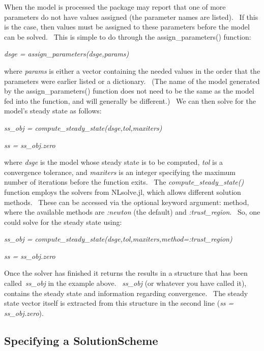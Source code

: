 \documentclass[notitlepage,11pt]{article}
\begin{document}
\bigskip

When the model is processed the package may report that one of more
parameters do not have values assigned (the parameter names are listed). \
If this is the case, then values must be assigned to these parameters before
the model can be solved. \ This is simple to do through the
assign\_parameters() function:

\bigskip

\textit{dsge = assign\_parameters(dsge,params)}

\bigskip

where \textit{params} is either a vector containing the needed values in the
order that the parameters were earlier listed or a dictionary. \ (The name
of the model generated by the assign\_parameters() function does not need to
be the same as the model fed into the function, and will generally be
different.) \ We can then solve for the model's steady state as follows:

\bigskip

\textit{ss\_obj = compute\_steady\_state(dsge,tol,maxiters)}

\textit{ss = ss\_obj.zero}

\bigskip

where \textit{dsge} is the model whose steady state is to be computed, 
\textit{tol} is a convergence tolerance, and \textit{maxiters} is an integer
specifying the maximum number of iterations before the function exits. \ The 
\textit{compute\_steady\_state()} function employs the solvers from
NLsolve.jl, which allows different solution methods. \ These can be accessed
via the optional keyword argument: method, where the available methods are 
\textit{:newton} (the default) and \textit{:trust\_region}. \ So, one could
solve for the steady state using:

\textit{ss\_obj =
compute\_steady\_state(dsge,tol,maxiters,method=:trust\_region)}

\textit{ss = ss\_obj.zero}

\bigskip

Once the solver has finished it returns the results in a structure that has
been called\ \textit{ss\_obj} in the example above. \ \textit{ss\_obj} (or
whatever you have called it), contains the steady state and information
regarding convergence. \ The steady state vector itself is extracted from
this structure in the second line (\textit{ss = ss\_obj.zero}).

\subsection{Specifying a SolutionScheme}
\end{document}
